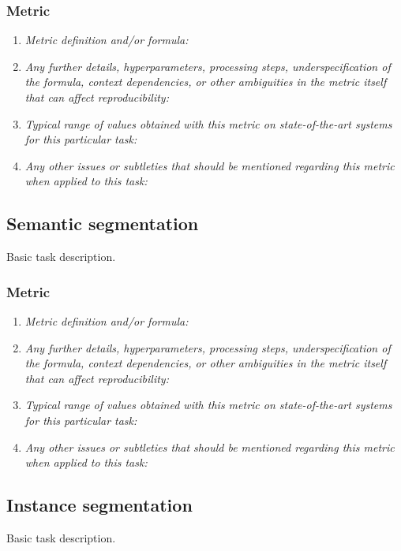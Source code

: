 \documentclass[a4paper,11pt]{article}
\begin{document}
    \subsubsection{Metric}
        \begin{enumerate}[label=\alph*.]
            \item \textit{Metric definition and/or formula:}
            \bigskip
            \item \textit{Any further details, hyperparameters, processing steps, underspecification of the formula, context dependencies, or other ambiguities in the metric itself that can affect reproducibility:}
            \bigskip
            \item \textit{Typical range of values obtained with this metric on state-of-the-art systems for this particular task:}
            \bigskip
            \item \textit{Any other issues or subtleties that should be mentioned regarding this metric when applied to this task:}
            \bigskip
        \end{enumerate}

\subsection{Semantic segmentation}
    Basic task description.
    \subsubsection{Metric}
        \begin{enumerate}[label=\alph*.]
            \item \textit{Metric definition and/or formula:}
            \bigskip
            \item \textit{Any further details, hyperparameters, processing steps, underspecification of the formula, context dependencies, or other ambiguities in the metric itself that can affect reproducibility:}
            \bigskip
            \item \textit{Typical range of values obtained with this metric on state-of-the-art systems for this particular task:}
            \bigskip
            \item \textit{Any other issues or subtleties that should be mentioned regarding this metric when applied to this task:}
            \bigskip
        \end{enumerate}

\subsection{Instance segmentation}
    Basic task description.
\end{document}

